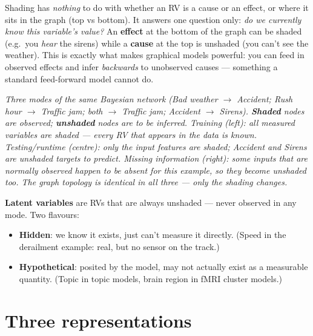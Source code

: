 \documentclass[11pt, a4paper]{article}
\begin{document}
\begin{notebox}
Shading has \emph{nothing} to do with whether an RV is a cause or an effect, or where it sits in the
graph (top vs bottom). It answers one question only: \emph{do we currently know this variable's
value?} An \textbf{effect} at the bottom of the graph can be shaded (e.g.\ you \emph{hear} the sirens)
while a \textbf{cause} at the top is unshaded (you can't see the weather). This is exactly what makes
graphical models powerful: you can feed in observed effects and infer \emph{backwards} to unobserved
causes — something a standard feed-forward model cannot do.
\end{notebox}

\begin{center}

\footnotesize\textit{Three modes of the same Bayesian network (Bad weather $\to$ Accident; Rush hour $\to$ Traffic jam; both $\to$ Traffic jam; Accident $\to$ Sirens). \textbf{Shaded} nodes are observed; \textbf{unshaded} nodes are to be inferred. \emph{Training} (left): all measured variables are shaded --- every RV that appears in the data is known. \emph{Testing/runtime} (centre): only the input features are shaded; Accident and Sirens are unshaded targets to predict. \emph{Missing information} (right): some inputs that are normally observed happen to be absent for this example, so they become unshaded too. The graph topology is identical in all three --- only the shading changes.}
\end{center}

\textbf{Latent variables} are RVs that are always unshaded — never observed in any mode. Two flavours:
\begin{itemize}
  \item \textbf{Hidden}: we know it exists, just can't measure it directly. (Speed in the derailment example: real, but no sensor on the track.)
  \item \textbf{Hypothetical}: posited by the model, may not actually exist as a measurable quantity. (Topic in topic models, brain region in fMRI cluster models.)
\end{itemize}

\section{Three representations}
\end{document}
